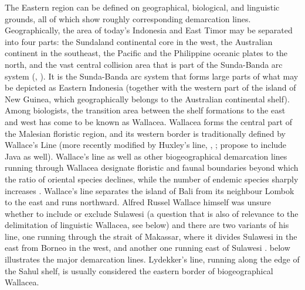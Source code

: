 The Eastern  region can be defined on geographical, biological, and linguistic grounds, all of which show roughly corresponding demarcation lines. Geographically, the area of today's Indonesia and East Timor may be separated into four parts: the Sundaland continental core in the west, the Australian continent in the southeast, the Pacific and the Philippine oceanic plates to the north, and the vast central collision area that is part of the Sunda-Banda arc system (\citealt{Bellwood2007}, \citealt{Hall2009}). It is the Sunda-Banda arc system that forms large parts of what may be depicted as Eastern Indonesia (together with the western part of the island of New Guinea, which geographically belongs to the Australian continental shelf). Among biologists, the transition area between the shelf formations to the east and west has come to be known as Wallacea. Wallacea forms the central part of the Malesian floristic region, and its western border is traditionally defined by Wallace's Line (more recently modified by Huxley's line, \citealt{Bellwood2007}, \citealt{Raes2009}; \citealt{Welzen2011} propose to include Java as well). Wallace's line as well as other biogeographical demarcation lines running through Wallacea designate floristic and faunal boundaries beyond which the ratio of oriental species declines, while the number of endemic species sharply increases \citep{Bellwood2007}. Wallace's line separates the island of Bali from its neighbour Lombok to the east and runs northward. Alfred Russel Wallace himself was unsure whether to include or exclude Sulawesi (a question that is also of relevance to the delimitation of linguistic Wallacea, see below) and there are two variants of his line, one running through the strait of Makassar, where it divides Sulawesi in the east from Borneo in the west, and another one running east of Sulawesi \citep{Welzen2011}.  below illustrates the major demarcation lines. Lydekker's line, running along the edge of the Sahul shelf, is usually considered the eastern border of biogeographical Wallacea.


